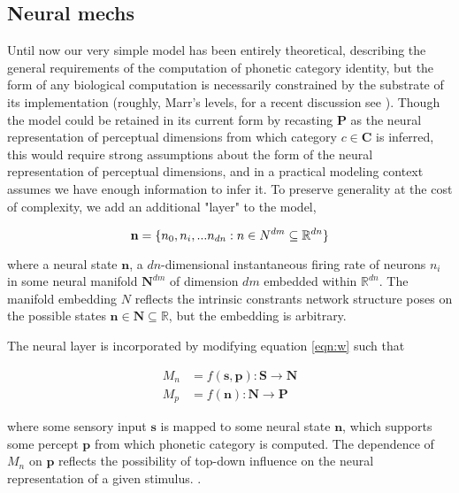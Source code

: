 
\subsection{Neural mechs}

Until now our very simple model has been entirely theoretical, describing the general requirements of the computation of phonetic category identity, but the form of any biological computation is necessarily constrained by the substrate of its implementation (roughly, Marr's levels, for a recent discussion see \citep{rooijTheoryTestHow2020}). Though the model could be retained in its current form by recasting $\mathbf{P}$ as the neural representation of perceptual dimensions from which category $c \in \mathbf{C}$ is inferred, this would require strong assumptions about the form of the neural representation of perceptual dimensions, and in a practical modeling context assumes we have enough information to infer it. To preserve generality at the cost of complexity, we add an additional "layer" to the model, 

\begin{equation}
\mathbf{n} = \{n_0, n_i, ... n_{dn} : n \in \mathbf \mathbf{N}^{dm} \subseteq \mathbb{R}^{dn}\}
\end{equation}

where a neural state $\mathbf{n}$, a $dn$-dimensional instantaneous firing rate of neurons $n_i$ in some neural manifold $\mathbf{N}^{dm}$ of dimension $dm$ embedded within $\mathbb{R}^{dn}$. The manifold embedding $N$ reflects the intrinsic constrants network structure poses on the possible states $\mathbf{n} \in \mathbf{N} \subseteq \mathbb{R}$, but the embedding is arbitrary.

The neural layer is incorporated by modifying equation \ref{eqn:w} such that

\begin{align}
M_n &= f(\mathbf{s}, \mathbf{p}) : \mathbf{S} \rightarrow \mathbf{N}\\
M_p &= f(\mathbf{n}) : \mathbf{N} \rightarrow \mathbf{P}
\end{align}

where some sensory input $\mathbf{s}$ is mapped to some neural state $\mathbf{n}$, which supports some percept $\mathbf{p}$ from which phonetic category is computed. The dependence of $M_n$ on $\mathbf{p}$ reflects the possibility of top-down influence on the neural representation of a given stimulus. . 

